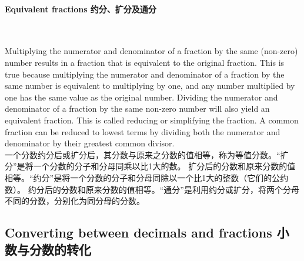 \paragraph{Equivalent fractions 约分、扩分及通分}
\ \ \\

\begin{paracol}{2}
Multiplying the numerator and denominator of a fraction by the same (non-zero) number results in a fraction that is equivalent to the original fraction. This is true because multiplying the numerator and denominator of a fraction by the same number is equivalent to multiplying by one, and any number multiplied by one has the same value as the original number. Dividing the numerator and denominator of a fraction by the same non-zero number will also yield an equivalent fraction. This is called reducing or simplifying the fraction. A common fraction can be reduced to lowest terms by dividing both the numerator and denominator by their greatest common divisor.
\switchcolumn
\ \\ 一个分数约分后或扩分后，其分数与原来之分数的值相等，称为等值分数。“扩分”是将一个分数的分子和分母同乘以比1大的数。 扩分后的分数和原来分数的值相等。“约分”是将一个分数的分子和分母同除以一个比1大的整数（它们的公约数）。 约分后的分数和原来分数的值相等。“通分”是利用约分或扩分，将两个分母不同的分数，分别化为同分母的分数。
\end{paracol}

\subsection{Converting between decimals and fractions 小数与分数的转化}

